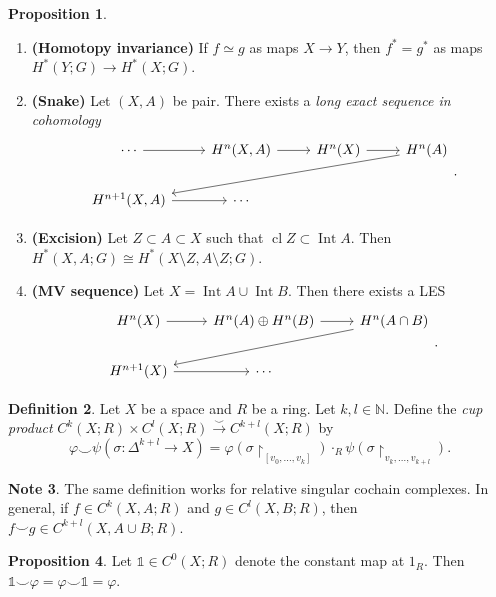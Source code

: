 \documentclass[10pt,letterpaper,cm]{nupset}
\theoremstyle{definition}
\newtheorem{definition}{Definition}[subsection]
\newtheorem{note}[definition]{Note}
\theoremstyle{theorem}
\newtheorem{prop}[definition]{Proposition}
\theoremstyle{remark}
\newcommand{\N}{\mathbb N}
\newcommand{\1}{\mathbb{1}}
\newcommand{\0}{\vec 0}
\DeclareMathOperator{\Int}{Int}
\DeclareMathOperator{\cl}{cl}
\begin{document}
\begin{prop} $ $
\begin{enumerate}
\item  {\textbf{(Homotopy invariance)}} If $f \simeq g$ as maps $X \to Y$, then $f^{\ast} = g^{\ast}$ as maps $H^{\ast}(Y; G) \to H^{\ast}(X; G)$.
\item {\textbf{(Snake)}} Let $(X, A)$ be pair. There exists a \textit{long exact sequence in cohomology}
\[
\begin{tikzcd}
\cdots \arrow[r]         & {H^n(X, A)} \arrow[r] & H^n(X) \arrow[r] & H^n(A) \arrow[llld] \\
{H^{n+1}(X,A)} \arrow[r] & \cdots                &                  &                    
\end{tikzcd}
.\]
\item {\textbf{(Excision)}} Let $Z \subset A \subset X$ such that $\cl{Z} \subset \Int{A}$. Then $H^{\ast}(X, A; G) \cong H^{\ast}(X \setminus Z, A \setminus Z; G)$.
\item {\textbf{(MV sequence)}} Let $X = \Int{A} \cup \Int{B}$. Then there exists a LES
\[
\begin{tikzcd}
H^n(X) \arrow[r]     & H^n(A) \oplus H^n(B) \arrow[r] & H^n(A \cap B) \arrow[lld] \\
H^{n+1}(X) \arrow[r] & \cdots                         &                          
\end{tikzcd}
.\]
\end{enumerate}
\end{prop}

\begin{definition}
Let $X$ be a space and $R$ be a ring. Let $k, l \in \N$. Define the \textit{cup product} $C^k(X; R) \times C^l(X; R) \overset{\smile}{\longrightarrow} C^{k+l}(X; R)$ by $$\varphi \smile \psi(\sigma: \Delta^{k+l} \to X) = \varphi(\sigma \restriction_{[v_0, \ldots, v_k]}) \cdot_R \psi(\sigma \restriction_{v_k, \ldots, v_{k+l}}).$$
\end{definition}

\begin{note}
The same definition works for relative singular cochain complexes. In general, if $f\in C^k(X, A; R)$ and $g \in C^l(X, B; R)$, then $f\smile g  \in  C^{k+l}(X, A \cup B; R) .$
\end{note}

\begin{prop} 
Let $\1 \in C^0(X; R)$ denote the constant map at $1_R$. Then $\1 \smile \varphi = \varphi \smile \1 = \varphi$.
\end{prop}
\end{document}
